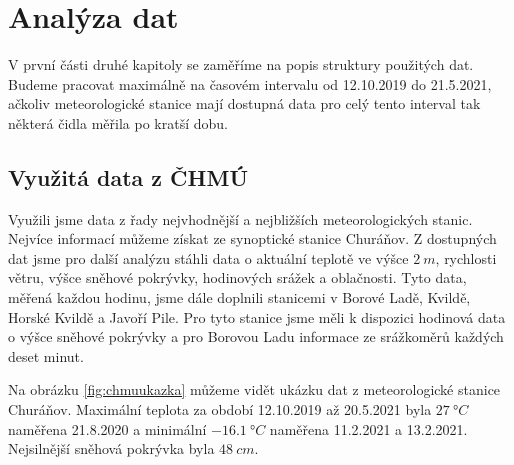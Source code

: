 \chapter{Analýza dat} \label{chap:analysis}
V první části druhé kapitoly se zaměříme na popis struktury použitých dat. Budeme pracovat maximálně na časovém intervalu od 12.10.2019 do 21.5.2021, ačkoliv meteorologické stanice mají dostupná data pro celý tento interval tak některá čidla měřila po kratší dobu.

\section{Využitá data z ČHMÚ}
Využili jsme data z řady nejvhodnější a nejbližších meteorologických stanic. Nejvíce informací můžeme získat ze synoptické stanice Churáňov. Z dostupných dat jsme pro další analýzu stáhli data o aktuální teplotě ve výšce $\SI{2}{m}$, rychlosti větru, výšce sněhové pokrývky, hodinových srážek a oblačnosti. Tyto data, měřená každou hodinu, jsme dále doplnili stanicemi v Borové Ladě, Kvildě, Horské Kvildě a Javoří Pile. Pro tyto stanice jsme měli k dispozici hodinová data o výšce sněhové pokrývky a pro Borovou Ladu informace ze srážkoměrů každých deset minut.

Na obrázku \ref{fig:chmuukazka} můžeme vidět ukázku dat z meteorologické stanice Churáňov. Maximální teplota za období 12.10.2019 až 20.5.2021 byla $\SI{27}{\degree C}$ naměřena 21.8.2020 a minimální $\SI{-16.1}{\degree C}$ naměřena 11.2.2021 a 13.2.2021. Nejsilnější sněhová pokrývka byla $\SI{48}{cm}$.

